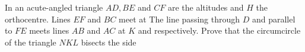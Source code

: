 In an acute-angled triangle  $AD,BE$ and $CF$ are the altitudes and $H$ the orthocentre. Lines $EF$ and $BC$ meet at  The line passing through $D$ and parallel to $FE$ meets lines $AB$ and $AC$ at $K$ and  respectively. Prove that the circumcircle of the triangle $NKL$ bisects the side 